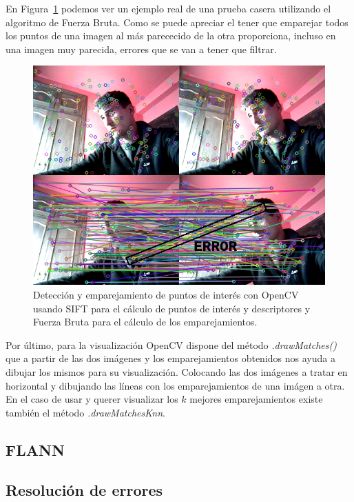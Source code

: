 En Figura~\ref{fig:SiftDetector} podemos ver un ejemplo real de una prueba casera utilizando el algoritmo de Fuerza Bruta. Como se puede apreciar el tener que emparejar todos los puntos de una imagen al más parececido de la otra proporciona, incluso en una imagen muy parecida, errores que se van a tener que filtrar.

\begin{figure}[th]
\centering
\includegraphics[scale=0.8]{Figures/sift-detector.png}
\decoRule
\caption[sift-detector]{Detección y emparejamiento de puntos de interés con OpenCV usando SIFT para el cálculo de puntos de interés y descriptores y Fuerza Bruta para el cálculo de los emparejamientos.}
\label{fig:SiftDetector}
\end{figure}



Por último, para la visualización OpenCV dispone del método \textit{.drawMatches()} que a partir de las dos imágenes y los emparejamientos obtenidos nos ayuda a dibujar los mismos para su visualización. Colocando las dos imágenes a tratar en horizontal y dibujando las líneas con los emparejamientos de una imágen a otra. En el caso de usar y querer visualizar los $k$ mejores emparejamientos existe también el método \textit{.drawMatchesKnn}.


\subsection{FLANN}


\subsection{Resolución de errores}

